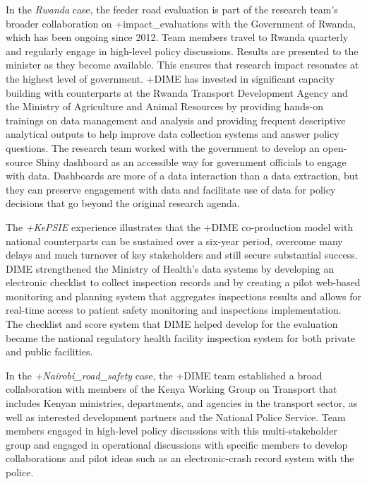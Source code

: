 \documentclass[
]{book}
\begin{document}
In the \emph{Rwanda} case, the feeder road evaluation is part of the research team's broader collaboration on +impact\_evaluations\textbar{} with the Government of Rwanda, which has been ongoing since 2012. Team members travel to Rwanda quarterly and regularly engage in high-level policy discussions. Results are presented to the minister as they become available. This ensures that research impact resonates at the highest level of government. +DIME\textbar{} has invested in significant capacity building with counterparts at the Rwanda Transport Development Agency and the Ministry of Agriculture and Animal Resources by providing hands-on trainings on data management and analysis and providing frequent descriptive analytical outputs to help improve data collection systems and answer policy questions. The research team worked with the government to develop an open-source Shiny dashboard as an accessible way for government officials to engage with data. Dashboards are more of a data interaction than a data extraction, but they can preserve engagement with data and facilitate use of data for policy decisions that go beyond the original research agenda.

The \emph{+KePSIE\textbar{}} experience illustrates that the +DIME\textbar{} co-production model with national counterparts can be sustained over a six-year period, overcome many delays and much turnover of key stakeholders and still secure substantial success. DIME strengthened the Ministry of Health's data systems by developing an electronic checklist to collect inspection records and by creating a pilot web-based monitoring and planning system that aggregates inspections results and allows for real-time access to patient safety monitoring and inspections implementation. The checklist and score system that DIME helped develop for the evaluation became the national regulatory health facility inspection system for both private and public facilities.

In the \emph{+Nairobi\_road\_safety\textbar{}} case, the +DIME\textbar{} team established a broad collaboration with members of the Kenya Working Group on Transport that includes Kenyan ministries, departments, and agencies in the transport sector, as well as interested development partners and the National Police Service. Team members engaged in high-level policy discussions with this multi-stakeholder group and engaged in operational discussions with specific members to develop collaborations and pilot ideas such as an electronic-crash record system with the police.
\end{document}
